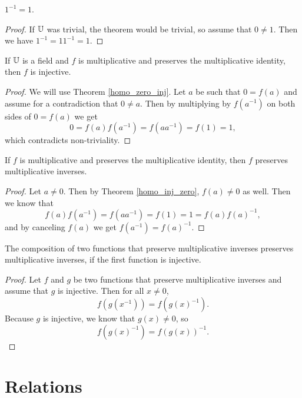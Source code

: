 \documentclass[../../math.tex]{subfiles}
\begin{document}
\begin{theorem}
    $1^{-1} = 1$.
\end{theorem}
\begin{proof}
    If $\mathbb{U}$ was trivial, the theorem would be trivial, so assume that $0 \neq
    1$.  Then we have $1^{-1} = 1 1^{-1} = 1$.
\end{proof}

\begin{instance}
    If $\mathbb{U}$ is a field and $f$ is multiplicative and preserves the
    multiplicative identity, then $f$ is injective.
\end{instance}
\begin{proof}
    We will use Theorem \ref{homo_zero_inj}.  Let $a$ be such that $0 = f(a)$
    and assume for a contradiction that $0 \neq a$.  Then by multiplying by
    $f(a^{-1})$ on both sides of $0 = f(a)$ we get
    \[
        0 = f(a) f(a^{-1}) = f(a a^{-1}) = f(1) = 1,
    \]
    which contradicts non-triviality.
\end{proof}

\begin{instance}
    If $f$ is multiplicative and preserves the multiplicative identity, then $f$
    preserves multiplicative inverses.
\end{instance}
\begin{proof}
    Let $a \neq 0$.  Then by Theorem \ref{homo_inj_zero}, $f(a) \neq 0$ as well.
    Then we know that \[
        f(a) f(a^{-1}) = f(a a^{-1}) = f(1) = 1 = f(a) f(a)^{-1},
    \]
    and by canceling $f(a)$ we get $f(a^{-1}) = f(a)^{-1}$.
\end{proof}

\begin{instance}
    The composition of two functions that preserve multiplicative inverses
    preserves multiplicative inverses, if the first function is injective.
\end{instance}
\begin{proof}
    Let $f$ and $g$ be two functions that preserve multiplicative inverses and
    assume that $g$ is injective.  Then for all $x \neq 0$,
    \[
        f(g(x^{-1})) = f(g(x)^{-1}).
    \]
    Because $g$ is injective, we know that $g(x) \neq 0$, so
    \[
        f(g(x)^{-1}) = f(g(x))^{-1}.
    \]
\end{proof}

\section{Relations}
\end{document}
